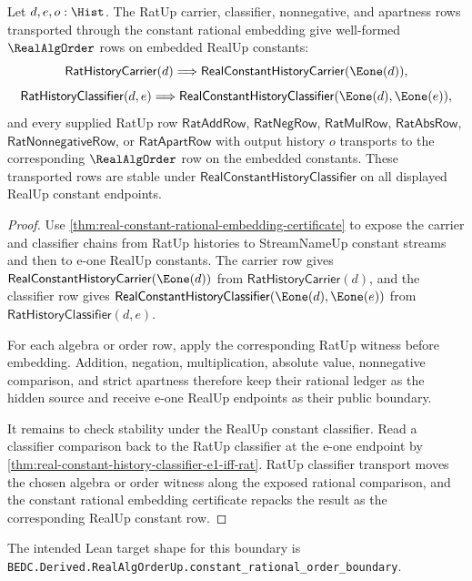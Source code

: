 \begin{theorem}
\label{thm:realalgorder-constant-rational-order-boundary}
Let $d,e,o:\Hist$. The RatUp carrier, classifier, nonnegative, and apartness
rows transported through the constant rational embedding give well-formed
$\RealAlgOrder$ rows on embedded RealUp constants:
$$
\mathsf{RatHistoryCarrier}(d)
\Longrightarrow
\mathsf{RealConstantHistoryCarrier}(\Eone(d)),
$$
$$
\mathsf{RatHistoryClassifier}(d,e)
\Longrightarrow
\mathsf{RealConstantHistoryClassifier}(\Eone(d),\Eone(e)),
$$
and every supplied RatUp row
$\mathsf{RatAddRow}$, $\mathsf{RatNegRow}$, $\mathsf{RatMulRow}$,
$\mathsf{RatAbsRow}$, $\mathsf{RatNonnegativeRow}$, or
$\mathsf{RatApartRow}$ with output history $o$ transports to the corresponding
$\RealAlgOrder$ row on the embedded constants. These transported rows are
stable under $\mathsf{RealConstantHistoryClassifier}$ on all displayed RealUp
constant endpoints.
\end{theorem}
\begin{proof}
Use \autoref{thm:real-constant-rational-embedding-certificate} to expose the
carrier and classifier chains from RatUp histories to StreamNameUp constant
streams and then to e-one RealUp constants. The carrier row gives
$\mathsf{RealConstantHistoryCarrier}(\Eone(d))$ from
$\mathsf{RatHistoryCarrier}(d)$, and the classifier row gives
$\mathsf{RealConstantHistoryClassifier}(\Eone(d),\Eone(e))$ from
$\mathsf{RatHistoryClassifier}(d,e)$.

For each algebra or order row, apply the corresponding RatUp witness before
embedding. Addition, negation, multiplication, absolute value, nonnegative
comparison, and strict apartness therefore keep their rational ledger as the
hidden source and receive e-one RealUp endpoints as their public boundary.

It remains to check stability under the RealUp constant classifier. Read a
classifier comparison back to the RatUp classifier at the e-one endpoint by
\autoref{thm:real-constant-history-classifier-e1-iff-rat}. RatUp classifier
transport moves the chosen algebra or order witness along the exposed rational
comparison, and the constant rational embedding certificate repacks the result
as the corresponding RealUp constant row.
\end{proof}

The intended Lean target shape for this boundary is
\texttt{BEDC.Derived.RealAlgOrderUp.constant\_rational\_order\_boundary}.

